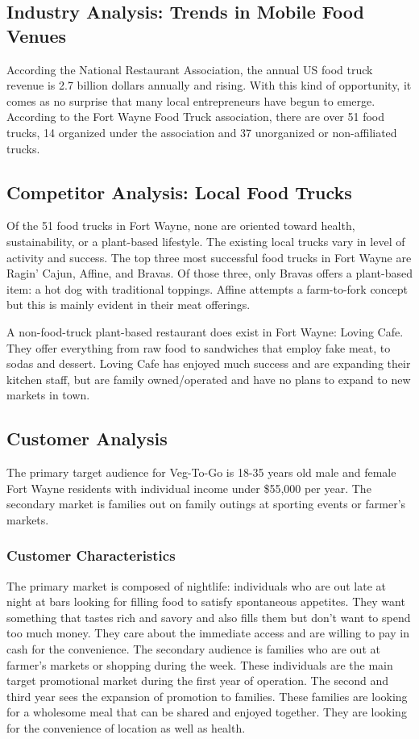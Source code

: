 \documentclass[12pt, letterpaper]{article}
\begin{document}
\subsection{Industry Analysis: Trends in Mobile Food Venues}
According the National Restaurant Association, the annual US food truck revenue is 2.7 billion dollars annually and rising. \cite{ibis1} With this kind of opportunity, it comes as no surprise
that many local entrepreneurs have begun to emerge. According to the Fort Wayne Food Truck association, there are over 51 food trucks, 14 organized under the association and 37 unorganized or non-affiliated trucks. \cite{fwfta}

\subsection{Competitor Analysis: Local Food Trucks}
Of the 51 food trucks in Fort Wayne, none are oriented toward health, sustainability, or a plant-based lifestyle. \cite{fwfta2} The existing local trucks vary in level of activity and success.  The top three most successful food trucks in Fort Wayne are Ragin' Cajun, Affine, and Bravas. \cite{fwfta2} Of those three, only Bravas offers a plant-based item: a hot dog with traditional toppings.  Affine attempts a farm-to-fork concept but this is mainly evident in their meat offerings.

A non-food-truck plant-based restaurant does exist in Fort Wayne: Loving Cafe. They offer everything from raw food to sandwiches that employ fake meat, to sodas and dessert.  Loving Cafe has enjoyed much success and are expanding their kitchen staff, but are family owned/operated and have no plans to expand to new markets in town.

\subsection{Customer Analysis}
The primary target audience for Veg-To-Go is 18-35 years old male and female Fort Wayne residents with individual income under \$55,000 per year.  The secondary market is families out on family outings at sporting events or farmer's markets.
\subsubsection{Customer Characteristics}
The primary market is composed of nightlife: individuals who are out late at night at bars looking for filling food to satisfy spontaneous appetites. They want something that tastes rich and savory and also fills them but don't want to spend too much money. They care about the immediate access and are willing to pay in cash for the convenience. The secondary audience is families who are out at farmer's markets or shopping during the week.  These individuals are the main target promotional market during the first year of operation.
The second and third year sees the expansion of promotion to families.  These families are looking for a wholesome meal that can be shared and enjoyed together. They are looking for the convenience of location as well as health. 
\end{document}
